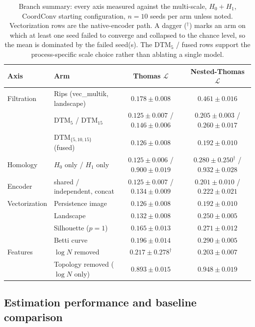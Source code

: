 \documentclass[11pt,a4paper]{article}
\begin{document}
\begin{table}[tbp]
\centering
\footnotesize
\begin{tabular}{llcc}
\toprule
Axis & Arm & Thomas $\mathcal{L}$ & Nested-Thomas $\mathcal{L}$ \\
\midrule
Filtration & Rips (vec\_multik, landscape) & $0.178 \pm 0.008$ & $0.461 \pm 0.016$ \\
           & DTM$_5$ / DTM$_{15}$ & $0.125 \pm 0.007$ / $0.146 \pm 0.006$ & $0.205 \pm 0.003$ / $0.260 \pm 0.017$ \\
           & DTM$_{\{5,10,15\}}$ (fused) & $0.126 \pm 0.008$ & $0.192 \pm 0.010$ \\
Homology   & $H_0$ only / $H_1$ only & $0.125 \pm 0.006$ / $0.900 \pm 0.019$ & $0.280 \pm 0.250^\dagger$ / $0.932 \pm 0.028$ \\
Encoder    & shared / independent, concat & $0.125 \pm 0.007$ / $0.134 \pm 0.009$ & $0.201 \pm 0.010$ / $0.222 \pm 0.021$ \\
Vectorization & Persistence image & $0.126 \pm 0.008$ & $0.192 \pm 0.010$ \\
           & Landscape & $0.132 \pm 0.008$ & $0.250 \pm 0.005$ \\
           & Silhouette ($p=1$) & $0.165 \pm 0.013$ & $0.271 \pm 0.012$ \\
           & Betti curve & $0.196 \pm 0.014$ & $0.290 \pm 0.005$ \\
Features   & $\log N$ removed & $0.217 \pm 0.278^\dagger$ & $0.203 \pm 0.007$ \\
           & Topology removed ($\log N$ only) & $0.893 \pm 0.015$ & $0.948 \pm 0.019$ \\
\bottomrule
\end{tabular}
\caption{Branch summary: every axis measured against the multi-scale,
$H_0{+}H_1$, CoordConv starting configuration, $n=10$ seeds per arm unless
noted. Vectorization rows are the native-encoder path. A dagger ($^\dagger$)
marks an arm on which at least one seed failed to converge and collapsed to the
chance level, so the mean is dominated by the failed seed(s). The DTM$_5$ / fused rows support the process-specific scale choice
rather than ablating a single model.}
\label{tab:branches}
\end{table}

\subsection{Estimation performance and baseline comparison}
\label{ssec:results}
\end{document}
